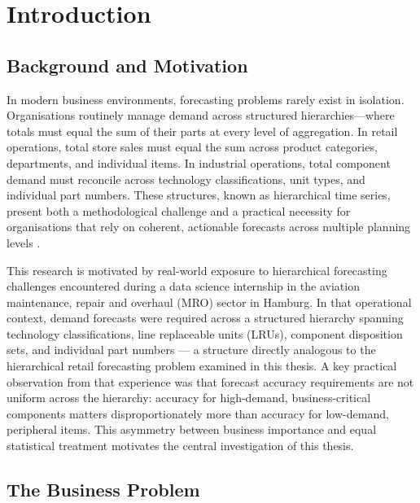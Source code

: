 %
%
%



\chapter{Introduction}
\label{chap:introduction}

\section{Background and Motivation}

In modern business environments, forecasting problems rarely exist in isolation. Organisations routinely manage demand across structured hierarchies—where totals must equal the sum of their parts at every level of aggregation. In retail operations, total store sales must equal the sum across product categories, departments, and individual items. In industrial operations, total component demand must reconcile across technology classifications, unit types, and individual part numbers. These structures, known as hierarchical time series, present both a methodological challenge and a practical necessity for organisations that rely on coherent, actionable forecasts across multiple planning levels \cite{Hyndman:2018}.

This research is motivated by real-world exposure to hierarchical forecasting challenges encountered during a data science internship in the aviation maintenance, repair and overhaul (MRO) sector in Hamburg. In that operational context, demand forecasts were required across a structured hierarchy spanning technology classifications, line replaceable units (LRUs), component disposition sets, and individual part numbers — a structure directly analogous to the hierarchical retail forecasting problem examined in this thesis. A key practical observation from that experience was that forecast accuracy requirements are not uniform across the hierarchy: accuracy for high-demand, business-critical components matters disproportionately more than accuracy for low-demand, peripheral items. This asymmetry between business importance and equal statistical treatment motivates the central investigation of this thesis.

\section{The Business Problem}

